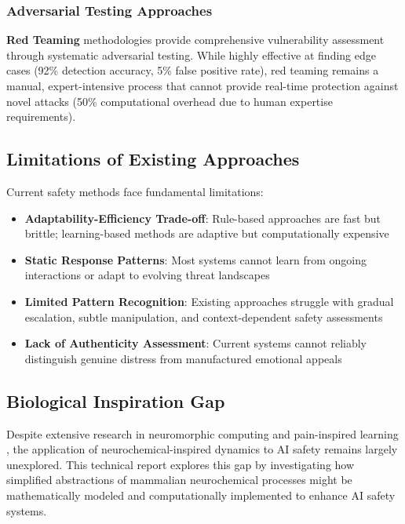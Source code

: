 \documentclass[12pt]{article}
\begin{document}
\subsubsection{Adversarial Testing Approaches}

\textbf{Red Teaming} methodologies \cite{ganguli2022red} provide comprehensive vulnerability assessment through systematic adversarial testing. While highly effective at finding edge cases (92\% detection accuracy, 5\% false positive rate), red teaming remains a manual, expert-intensive process that cannot provide real-time protection against novel attacks (50\% computational overhead due to human expertise requirements).

\subsection{Limitations of Existing Approaches}

Current safety methods face fundamental limitations:

\begin{itemize}
\item \textbf{Adaptability-Efficiency Trade-off}: Rule-based approaches are fast but brittle; learning-based methods are adaptive but computationally expensive
\item \textbf{Static Response Patterns}: Most systems cannot learn from ongoing interactions or adapt to evolving threat landscapes
\item \textbf{Limited Pattern Recognition}: Existing approaches struggle with gradual escalation, subtle manipulation, and context-dependent safety assessments
\item \textbf{Lack of Authenticity Assessment}: Current systems cannot reliably distinguish genuine distress from manufactured emotional appeals
\end{itemize}

\subsection{Biological Inspiration Gap}

Despite extensive research in neuromorphic computing \cite{roy2019towards} and pain-inspired learning \cite{alexander2013pain}, the application of neurochemical-inspired dynamics to AI safety remains largely unexplored. This technical report explores this gap by investigating how simplified abstractions of mammalian neurochemical processes might be mathematically modeled and computationally implemented to enhance AI safety systems.
\end{document}
